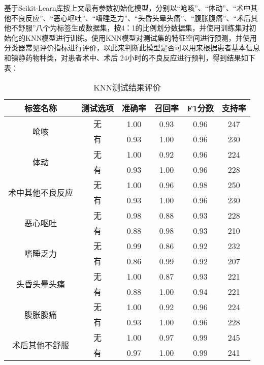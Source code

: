 基于Scikit-Learn库按上文最有参数初始化模型，分别以“呛咳”、“体动”、“术中其他不良反应”、“恶心呕吐”、“嗜睡乏力”、“头昏头晕头痛”、“腹胀腹痛”、“术后其他不舒服”八个为标签生成数据集，按4：1的比例划分数据集，并使用训练集对初始化的KNN模型进行训练。使用KNN模型对测试集的特征空间进行预测，并使用分类器常见评价指标进行评价，以此来判断此模型是否可以用来根据患者基本信息和镇静药物种类，对患者术中、术后 24小时的不良反应进行预判，得到结果如下表：

\begin{table}[H]
    \centering  
    \caption{KNN测试结果评价}
    \begin{tabular}{c c c c c c}  
    	\toprule[1.5pt]  
    	标签名称 & 测试选项 & 准确率 & 召回率 & F1分数 & 支持率 \\  
    	\midrule[1pt]    
    	\multirow{2}{*}{呛咳} & 无 & 1.00	& 0.93	& 0.96	& 247 \\ 
    	                      & 有 & 0.93	& 1.00	& 0.96	& 230 \\
    	\multirow{2}{*}{体动} & 无 & 1.00	& 0.92	& 0.96	& 224 \\
    	                      & 有 & 0.93	& 1.00	& 0.96	& 228 \\
    	\multirow{2}{*}{术中其他不良反应} & 无 & 1.00   & 0.96  & 0.98  & 250 \\ 
    	                                  & 有 & 0.93	& 1.00	& 0.96	& 230 \\
    	\multirow{2}{*}{恶心呕吐} & 无 & 0.98 & 0.88 & 0.93 & 228 \\
    	                          & 有 & 0.88 & 0.98 & 0.93 & 210 \\
    	\multirow{2}{*}{嗜睡乏力} & 无 & 0.99 & 0.86 & 0.92 & 232 \\ 
    	                          & 有 & 0.86 & 0.99 & 0.92 & 207 \\
    	\multirow{2}{*}{头昏头晕头痛} & 无 &  1.00 & 0.87 & 0.93 & 221 \\
    	                              & 有 &  0.88 & 1.00 & 0.94 & 221 \\
    	\multirow{2}{*}{腹胀腹痛} & 无 &  1.00 & 0.92 & 0.96 & 224 \\ 
    	                          & 有 &  0.93 & 1.00 & 0.96 & 228 \\
        \multirow{2}{*}{术后其他不舒服} & 无 & 1.00 & 0.97 & 0.99 & 245 \\
    	                      & 有 & 0.97  & 1.00  & 0.99  & 241  \\ 
    	\toprule[1.5pt]  
    \end{tabular}  
\end{table} 

